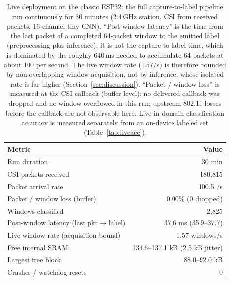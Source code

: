 \documentclass{ieeeaccess}
\begin{document}
\begin{table}[t]
\caption{Live deployment on the classic ESP32: the full capture-to-label pipeline run continuously for 30 minutes (2.4\,GHz station, CSI from received packets, 16-channel tiny CNN). ``Post-window latency'' is the time from the last packet of a completed 64-packet window to the emitted label (preprocessing plus inference); it is not the capture-to-label time, which is dominated by the roughly 640\,ms needed to accumulate 64 packets at about 100 per second. The live window rate (1.57/s) is therefore bounded by non-overlapping window acquisition, not by inference, whose isolated rate is far higher (Section~\ref{sec:discussion}). ``Packet / window loss'' is measured at the CSI callback (buffer level): no delivered callback was dropped and no window overflowed in this run; upstream 802.11 losses before the callback are not observable here. Live in-domain classification accuracy is measured separately from an on-device labeled set (Table~\ref{tab:liveacc}).}
\label{tab:live}
\centering
\footnotesize
\begin{tabular}{lr}
\toprule
Metric & Value \\
\midrule
Run duration                  & 30 min \\
CSI packets received          & 180{,}815 \\
Packet arrival rate           & 100.5 /s \\
Packet / window loss (buffer) & 0.00\% (0 dropped) \\
Windows classified            & 2{,}825 \\
Post-window latency (last pkt$\to$label) & 37.6 ms (35.9--37.7) \\
Live window rate (acquisition-bound) & 1.57 windows/s \\
Free internal SRAM            & 134.6--137.1 kB (2.5 kB jitter) \\
Largest free block            & 88.0--92.0 kB \\
Crashes / watchdog resets     & 0 \\
\bottomrule
\end{tabular}
\end{table}
\end{document}
